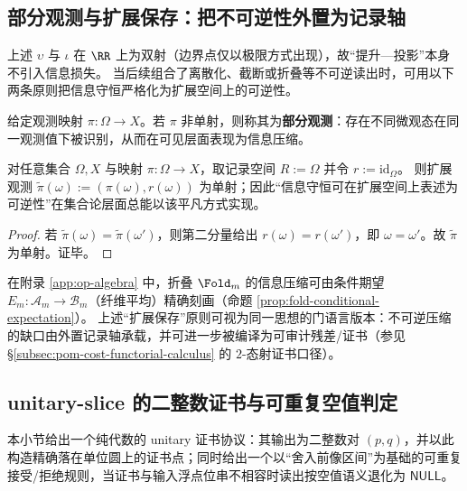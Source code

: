 \subsection{部分观测与扩展保存：把不可逆性外置为记录轴}\label{subsec:unit-circle-phase-information}
上述 \(\upsilon\) 与 \(\iota\) 在 \(\RR\) 上为双射（边界点仅以极限方式出现），故“提升—投影”本身不引入信息损失。
当后续组合了离散化、截断或折叠等不可逆读出时，可用以下两条原则把信息守恒严格化为扩展空间上的可逆性。

\begin{definition}[部分观测]\label{def:unit-circle-phase-partial-observation}
给定观测映射 \(\pi:\Omega\to X\)。若 \(\pi\) 非单射，则称其为\textbf{部分观测}：存在不同微观态在同一观测值下被识别，从而在可见层面表现为信息压缩。
\end{definition}

\begin{proposition}\label{prop:unit-circle-phase-extension-preserving}
对任意集合 \(\Omega,X\) 与映射 \(\pi:\Omega\to X\)，取记录空间 \(R:=\Omega\) 并令 \(r:=\mathrm{id}_\Omega\)。
则扩展观测
\(
\widetilde\pi(\omega):=(\pi(\omega),r(\omega))
\)
为单射；因此“信息守恒可在扩展空间上表述为可逆性”在集合论层面总能以该平凡方式实现。
\end{proposition}
\begin{proof}
若 \(\widetilde\pi(\omega)=\widetilde\pi(\omega')\)，则第二分量给出 \(r(\omega)=r(\omega')\)，即 \(\omega=\omega'\)。故 \(\widetilde\pi\) 为单射。证毕。
\end{proof}

\begin{remark}
在附录 \ref{app:op-algebra} 中，折叠 \(\Fold_m\) 的信息压缩可由条件期望 \(E_m:\mathcal{A}_m\to\mathcal{B}_m\)（纤维平均）精确刻画（命题 \ref{prop:fold-conditional-expectation}）。
上述“扩展保存”原则可视为同一思想的门语言版本：不可逆压缩的缺口由外置记录轴承载，并可进一步被编译为可审计残差/证书（参见 \S\ref{subsec:pom-cost-functorial-calculus} 的 \(2\)-态射证书口径）。
\end{remark}

\subsection{unitary-slice 的二整数证书与可重复空值判定}\label{subsec:unitary-two-integer-certificate}
本小节给出一个纯代数的 unitary 证书协议：其输出为二整数对 \((p,q)\)，并以此构造精确落在单位圆上的证书点；同时给出一个以“舍入前像区间”为基础的可重复接受/拒绝规则，当证书与输入浮点位串不相容时读出按空值语义退化为 \(\mathsf{NULL}\)。


